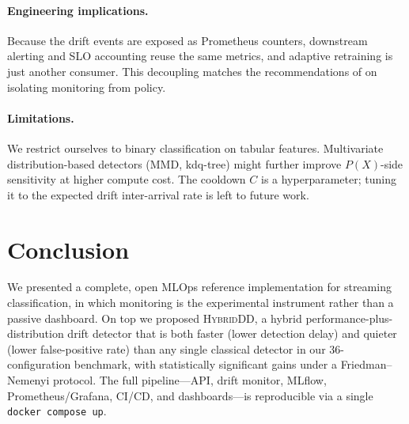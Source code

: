 \documentclass[conference]{IEEEtran}
\begin{document}
\paragraph*{Engineering implications.} Because the drift events are
exposed as Prometheus counters, downstream alerting and
SLO accounting reuse the same metrics, and adaptive retraining is just
another consumer. This decoupling matches the recommendations of
\cite{breck2017tfx} on isolating monitoring from policy.

\paragraph*{Limitations.} We restrict ourselves to binary classification
on tabular features. Multivariate distribution-based detectors
(MMD, kdq-tree) might further improve $P(X)$-side sensitivity at higher
compute cost. The cooldown $C$ is a hyperparameter; tuning it to the
expected drift inter-arrival rate is left to future work.

\section{Conclusion}
\label{sec:conclusion}

We presented a complete, open MLOps reference implementation for streaming
classification, in which monitoring is the experimental instrument rather than
a passive dashboard. On top we proposed \textsc{HybridDD}, a hybrid
performance-plus-distribution drift detector that is both faster (lower
detection delay) and quieter (lower false-positive rate) than any single
classical detector in our 36-configuration benchmark, with statistically
significant gains under a Friedman--Nemenyi protocol. The full pipeline---API,
drift monitor, MLflow, Prometheus/Grafana, CI/CD, and dashboards---is
reproducible via a single \verb|docker compose up|.




\end{document}
